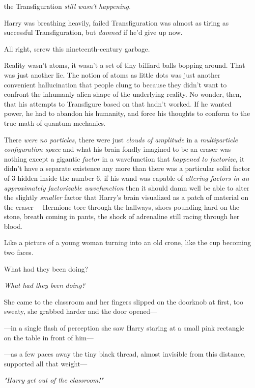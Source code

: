 {\el} the Transfiguration \emph{still wasn't happening.}

Harry was breathing heavily, failed Transfiguration was almost as tiring as
successful Transfiguration, but \emph{damned} if he'd give up now.

All right, screw this nineteenth-century garbage.

Reality wasn't atoms, it wasn't a set of tiny billiard balls bopping around.
That was just another lie. The notion of atoms as little dots was just another
convenient hallucination that people clung to because they didn't want to
confront the inhumanly alien shape of the underlying reality. No wonder, then,
that his attempts to Transfigure based on that hadn't worked. If he wanted
power, he had to abandon his humanity, and force his thoughts to conform to the
true math of quantum mechanics.

There \emph{were no particles,} there were just \emph{clouds of amplitude} in a
\emph{multiparticle configuration space} and what his brain fondly imagined to
be an eraser was nothing except a gigantic \emph{factor} in a wavefunction that
\emph{happened to factorize}, it didn't have a separate existence any more than
there was a particular solid factor of 3 hidden inside the number 6, if his
wand was capable of \emph{altering factors in an approximately factorizable
wavefunction} then it should damn well be able to alter the slightly
\emph{smaller} factor that Harry's brain visualized as a patch of material on
the eraser\mbox{---}
\sbreak
Hermione tore through the hallways, shoes pounding hard on the stone, breath
coming in pants, the shock of adrenaline still racing through her blood.

Like a picture of a young woman turning into an old crone, like the cup
becoming two faces.

What had they been doing?

\emph{What had they been doing?}

She came to the classroom and her fingers slipped on the doorknob at first, too
sweaty, she grabbed harder and the door opened\mbox{---}

---in a single flash of perception she saw Harry staring at a small pink
rectangle on the table in front of him\mbox{---}

---as a few paces away the tiny black thread, almost invisible from this
distance, supported all that weight\mbox{---}

\emph{"Harry get out of the classroom!"}

